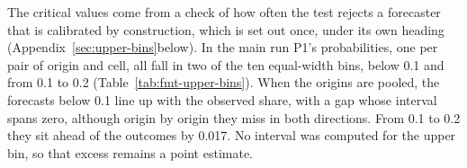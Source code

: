 The critical values come from a check of how often the test rejects a forecaster that is calibrated by construction, which is set out once, under its own heading (\iftmlr Appendix~\ref{sec:upper-bins}\else below\fi).
\label{sec:upper-bins}
In the main run P1's probabilities, one per pair of origin and cell, all fall in two of the ten equal-width bins, below 0.1 and from 0.1 to 0.2 (Table~\ref{tab:fmt-upper-bins}). When the origins are pooled, the forecasts below 0.1 line up with the observed share, with a gap whose interval spans zero, although origin by origin they miss in both directions. From 0.1 to 0.2 they sit ahead of the outcomes by 0.017. No interval was computed for the upper bin, so that excess remains a point estimate.

\begin{table}[t]\centering\scriptsize
\caption{Reliability bins for P1 on the headline archive, with all rows included; no row sits above the second bin, which contains forecasts from 0.1 to 0.2. The columns give the rows in each bin, the mean forecast, the share with a significant positive result, and the gap between them. An interval was computed only for the gap in the lowest bin.}
\label{tab:fmt-upper-bins}

\end{table}

